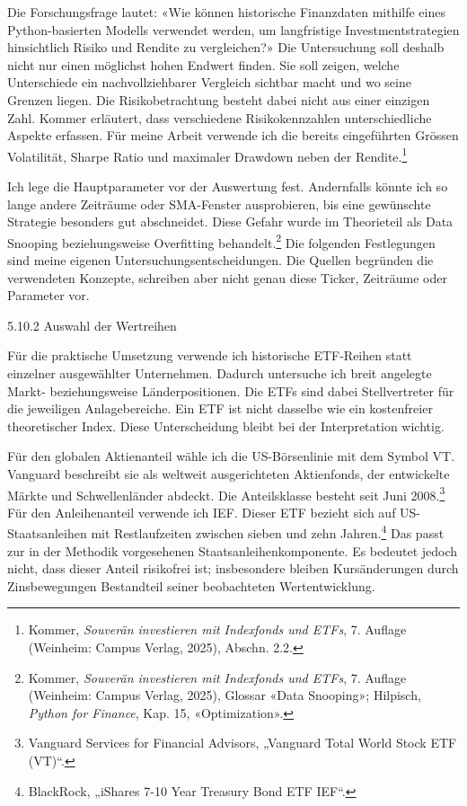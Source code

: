 \documentclass[
  ngerman,
  a4paper,
  DIV=11,
  oneside]{scrreprt}
\begin{document}
Die Forschungsfrage lautet: «Wie können historische Finanzdaten mithilfe
eines Python-basierten Modells verwendet werden, um langfristige
Investmentstrategien hinsichtlich Risiko und Rendite zu vergleichen?»
Die Untersuchung soll deshalb nicht nur einen möglichst hohen Endwert
finden. Sie soll zeigen, welche Unterschiede ein nachvollziehbarer
Vergleich sichtbar macht und wo seine Grenzen liegen. Die
Risikobetrachtung besteht dabei nicht aus einer einzigen Zahl. Kommer
erläutert, dass verschiedene Risikokennzahlen unterschiedliche Aspekte
erfassen. Für meine Arbeit verwende ich die bereits eingeführten Grössen
Volatilität, Sharpe Ratio und maximaler Drawdown neben der
Rendite.\footnote{Kommer, \emph{Souverän investieren mit Indexfonds und
  ETFs}, 7. Auflage (Weinheim: Campus Verlag, 2025), Abschn. 2.2.}

Ich lege die Hauptparameter vor der Auswertung fest. Andernfalls könnte
ich so lange andere Zeiträume oder SMA-Fenster ausprobieren, bis eine
gewünschte Strategie besonders gut abschneidet. Diese Gefahr wurde im
Theorieteil als Data Snooping beziehungsweise Overfitting
behandelt.\footnote{Kommer, \emph{Souverän investieren mit Indexfonds
  und ETFs}, 7. Auflage (Weinheim: Campus Verlag, 2025), Glossar «Data
  Snooping»; Hilpisch, \emph{Python for Finance}, Kap. 15,
  «Optimization».} Die folgenden Festlegungen sind meine eigenen
Untersuchungsentscheidungen. Die Quellen begründen die verwendeten
Konzepte, schreiben aber nicht genau diese Ticker, Zeiträume oder
Parameter vor.

5.10.2 Auswahl der Wertreihen

Für die praktische Umsetzung verwende ich historische ETF-Reihen statt
einzelner ausgewählter Unternehmen. Dadurch untersuche ich breit
angelegte Markt- beziehungsweise Länderpositionen. Die ETFs sind dabei
Stellvertreter für die jeweiligen Anlagebereiche. Ein ETF ist nicht
dasselbe wie ein kostenfreier theoretischer Index. Diese Unterscheidung
bleibt bei der Interpretation wichtig.

Für den globalen Aktienanteil wähle ich die US-Börsenlinie mit dem
Symbol VT. Vanguard beschreibt sie als weltweit ausgerichteten
Aktienfonds, der entwickelte Märkte und Schwellenländer abdeckt. Die
Anteilsklasse besteht seit Juni 2008.\footnote{Vanguard Services for
  Financial Advisors, {„Vanguard {Total World Stock ETF} ({VT})``}.} Für
den Anleihenanteil verwende ich IEF. Dieser ETF bezieht sich auf
US-Staatsanleihen mit Restlaufzeiten zwischen sieben und zehn
Jahren.\footnote{BlackRock, {„{iShares} 7-10 {Year Treasury Bond ETF}
  \textbar{} {IEF}``}.} Das passt zur in der Methodik vorgesehenen
Staatsanleihenkomponente. Es bedeutet jedoch nicht, dass dieser Anteil
risikofrei ist; insbesondere bleiben Kursänderungen durch Zinsbewegungen
Bestandteil seiner beobachteten Wertentwicklung.
\end{document}
